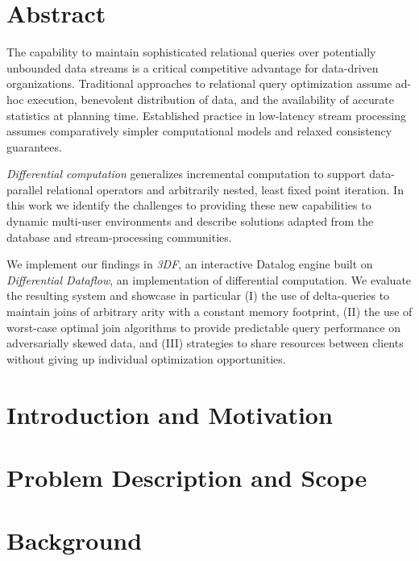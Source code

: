 \documentclass{article}
\begin{document}
\tableofcontents

\newpage

\section{Abstract} \label{abstract}

The capability to maintain sophisticated relational queries over
potentially unbounded data streams is a critical competitive advantage
for data-driven organizations. Traditional approaches to relational
query optimization assume ad-hoc execution, benevolent distribution of
data, and the availability of accurate statistics at planning
time. Established practice in low-latency stream processing assumes
comparatively simpler computational models and relaxed consistency
guarantees.

\emph{Differential computation} generalizes incremental computation to
support data-parallel relational operators and arbitrarily nested,
least fixed point iteration. In this work we identify the challenges
to providing these new capabilities to dynamic multi-user environments
and describe solutions adapted from the database and stream-processing
communities.

We implement our findings in \emph{3DF}, an interactive Datalog engine
built on \emph{Differential Dataflow}, an implementation of
differential computation. We evaluate the resulting system and
showcase in particular (I) the use of delta-queries to maintain joins
of arbitrary arity with a constant memory footprint, (II) the use of
worst-case optimal join algorithms to provide predictable query
performance on adversarially skewed data, and (III) strategies to
share resources between clients without giving up individual
optimization opportunities.

\newpage

\section{Introduction and Motivation} \label{intro}

\newpage

\section{Problem Description and Scope} \label{problem}

\newpage

\section{Background} \label{background}

\end{document}
